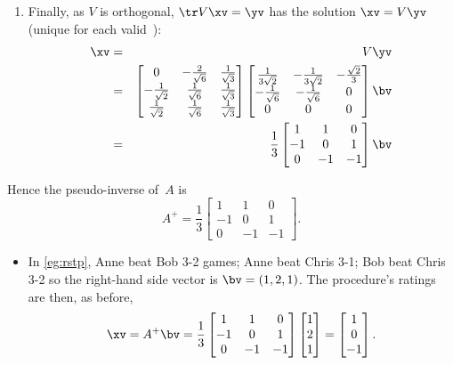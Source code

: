 \begin{example}
\begin{solution}
\begin{enumerate}
\item Finally, as \(V\) is orthogonal, \(\tr V\xv=\yv\) has the solution \(\xv=V\yv\) (unique for each valid~\yv):
\begin{eqnarray*}
\xv&=&V\yv
\\&=&\begin{bmatrix} 0&-\frac2{\sqrt6}&\frac1{\sqrt3}
\\-\frac1{\sqrt2}&\frac1{\sqrt6}&\frac1{\sqrt3}
\\\frac1{\sqrt2}&\frac1{\sqrt6}&\frac1{\sqrt3} \end{bmatrix}
\begin{bmatrix} \frac1{3\sqrt2}&-\frac1{3\sqrt2}&-\frac{\sqrt2}3 
\\-\frac1{\sqrt6}&-\frac1{\sqrt6}&0
\\0&0&0 \end{bmatrix}\bv
\\&=&\frac13\begin{bmatrix} 1&1&0
\\-1&0&1
\\0& -1&-1 \end{bmatrix}\bv
\end{eqnarray*}
\end{enumerate}
Hence the pseudo-inverse of~\(A\) is
\begin{equation*}
A^+=\frac13\begin{bmatrix} 1&1&0
\\-1&0&1
\\0& -1&-1 \end{bmatrix}.
\end{equation*}
\begin{itemize}
\item In \autoref{eg:rstp}, Anne beat Bob
3-2 games; Anne beat Chris 3-1; Bob beat Chris 3-2 so the right-hand side vector is \(\bv=(1,2,1)\).
The procedure's ratings are then, as before, 
\begin{equation*}
\xv=A^+\bv=\frac13\begin{bmatrix} 1&1&0
\\-1&0&1
\\0& -1&-1 \end{bmatrix}\begin{bmatrix} 1\\2\\1 \end{bmatrix}
=\begin{bmatrix} 1\\0\\-1 \end{bmatrix}.
\end{equation*}


\end{itemize}
\end{solution}
\end{example}

